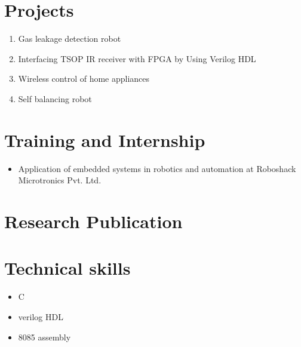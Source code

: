 \documentclass[11pt]{article}
\begin{document}
\section*{Projects}  
\begin{enumerate}
	\item Gas leakage detection robot
	\item Interfacing TSOP IR receiver with FPGA by Using Verilog HDL
	\item Wireless control of home appliances
	\item Self balancing robot
\end{enumerate}	
\section*{Training and Internship}  
\begin{itemize}
	\item	Application of embedded systems in robotics and automation at Roboshack Microtronics Pvt. Ltd. 
\end{itemize}
\section*{Research Publication}
\section*{Technical skills}   
\begin{itemize}
	\item C
	\item verilog HDL
	\item 8085 assembly
\end{itemize} 	
\end{document}

